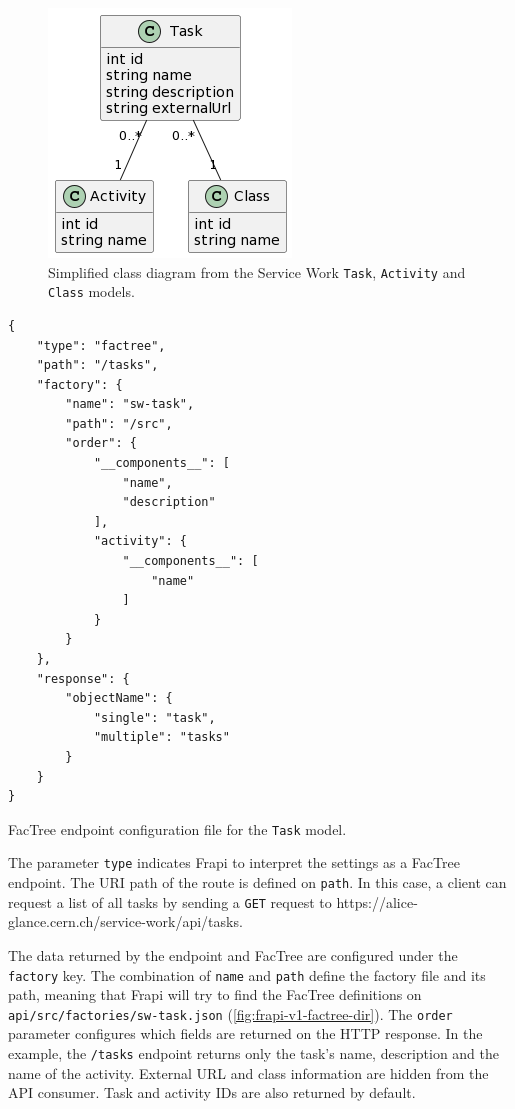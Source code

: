 \begin{figure}[htbp]
  \centering
  \includegraphics[scale=0.77]{Imagens/chap03/class-diagram-sw-task.png}
  \caption{Simplified class diagram from the Service Work \texttt{Task}, \texttt{Activity} and \texttt{Class} models.}
  \label{fig:class-diagram-sw-task}
\end{figure}

\begin{listing}[htbp]
\begin{verbatim}
{
    "type": "factree",
    "path": "/tasks",
    "factory": {
        "name": "sw-task",
        "path": "/src",
        "order": {
            "__components__": [
                "name",
                "description"
            ],
            "activity": {
                "__components__": [
                    "name"
                ]
            }
        }
    },
    "response": {
        "objectName": {
            "single": "task",
            "multiple": "tasks"
        }
    }
}
\end{verbatim}
\caption{FacTree endpoint configuration file for the \texttt{Task} model.}
\label{code:task-factree-endpoint-settings}
\end{listing}

The parameter \texttt{type} indicates Frapi to interpret the settings as a FacTree endpoint. The URI path of the route is defined on \texttt{path}. In this case, a client can request a list of all tasks by sending a \texttt{GET} request to https://alice-glance.cern.ch/service-work/api/tasks.

The data returned by the endpoint and FacTree are configured under the \texttt{factory} key.  The combination of \texttt{name} and \texttt{path} define the factory file and its path, meaning that Frapi will try to find the FacTree definitions on \texttt{api/src/factories/sw-task.json} (\autoref{fig:frapi-v1-factree-dir}). The \texttt{order} parameter configures which fields are returned on the HTTP response. In the example, the \texttt{/tasks} endpoint returns only the task's name, description and the name of the activity. External URL and class information are hidden from the API consumer. Task and activity IDs are also returned by default.

